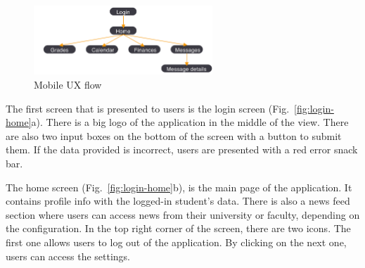 \begin{figure}[htb]
    \centering
    \includegraphics[width=0.6\textwidth]{fig03/mobile_ux_flow.png}
    \caption{Mobile UX flow}
    \label{fig:ux-flow}
\end{figure}

The first screen that is presented to users is the login screen (Fig.~\ref{fig:login-home}a). There is a big logo of the application in the middle of the view. There are also two input boxes on the bottom of the screen with a button to submit them. If the data provided is incorrect, users are presented with a red error snack bar.

The home screen (Fig.~\ref{fig:login-home}b), is the main page of the application. It contains profile info with the logged-in student's data. There is also a news feed section where users can access news from their university or faculty, depending on the configuration. In the top right corner of the screen, there are two icons. The first one allows users to log out of the application. By clicking on the next one, users can access the settings.

